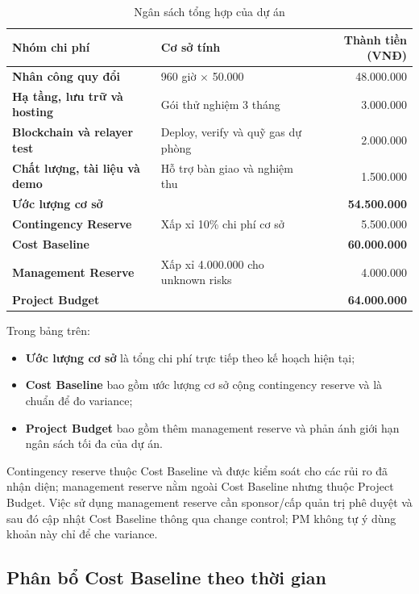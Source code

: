 \begin{table}[H]
\centering
\caption{Ngân sách tổng hợp của dự án}
\label{tab:project-budget}
\begin{tabularx}{\textwidth}{| >{\bfseries}p{5.2cm} | p{4.2cm} | r |}
\hline
Nhóm chi phí & Cơ sở tính & Thành tiền (VNĐ) \\
\hline
Nhân công quy đổi & 960 giờ $\times$ 50.000 & 48.000.000 \\ \hline
Hạ tầng, lưu trữ và hosting & Gói thử nghiệm 3 tháng & 3.000.000 \\ \hline
Blockchain và relayer test & Deploy, verify và quỹ gas dự phòng & 2.000.000 \\ \hline
Chất lượng, tài liệu và demo & Hỗ trợ bàn giao và nghiệm thu & 1.500.000 \\
\hline
\textbf{Ước lượng cơ sở} &  & \textbf{54.500.000} \\ \hline
Contingency Reserve & Xấp xỉ 10\% chi phí cơ sở & 5.500.000 \\
\hline
\textbf{Cost Baseline} &  & \textbf{60.000.000} \\ \hline
Management Reserve & Xấp xỉ 4.000.000 cho unknown risks & 4.000.000 \\
\hline
\textbf{Project Budget} &  & \textbf{64.000.000} \\
\hline
\end{tabularx}
\end{table}

Trong bảng trên:

\begin{itemize}
  \item \textbf{Ước lượng cơ sở} là tổng chi phí trực tiếp theo kế hoạch hiện tại;
  \item \textbf{Cost Baseline} bao gồm ước lượng cơ sở cộng contingency reserve và là chuẩn để đo variance;
  \item \textbf{Project Budget} bao gồm thêm management reserve và phản ánh giới hạn ngân sách tối đa của dự án.
\end{itemize}

Contingency reserve thuộc Cost Baseline và được kiểm soát cho các rủi ro đã nhận diện; management reserve nằm ngoài Cost Baseline nhưng thuộc Project Budget. Việc sử dụng management reserve cần sponsor/cấp quản trị phê duyệt và sau đó cập nhật Cost Baseline thông qua change control; PM không tự ý dùng khoản này chỉ để che variance.

\subsection{Phân bổ Cost Baseline theo thời gian}

